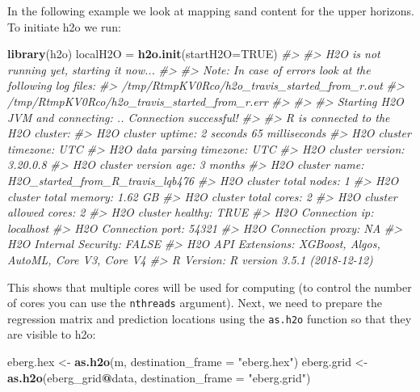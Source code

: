 \documentclass[graybox,natbib,nospthms,UStrade]{svmono}
\newenvironment{Shaded}{\begin{snugshade}}{\end{snugshade}}
\newcommand{\CommentTok}[1]{\textcolor[rgb]{0.37,0.37,0.37}{\textit{#1}}}
\newcommand{\DataTypeTok}[1]{\textcolor[rgb]{0.27,0.27,0.27}{#1}}
\newcommand{\KeywordTok}[1]{\textcolor[rgb]{0.27,0.27,0.27}{\textbf{#1}}}
\newcommand{\NormalTok}[1]{#1}
\newcommand{\OperatorTok}[1]{\textcolor[rgb]{0.43,0.43,0.43}{\textbf{#1}}}
\newcommand{\OtherTok}[1]{\textcolor[rgb]{0.37,0.37,0.37}{#1}}
\newcommand{\StringTok}[1]{\textcolor[rgb]{0.5,0.5,0.5}{#1}}
\begin{document}
In the following example we look at mapping sand content for the upper horizons. To initiate h2o we run:

\begin{Shaded}
\begin{Highlighting}[]
\KeywordTok{library}\NormalTok{(h2o)}
\NormalTok{localH2O =}\StringTok{ }\KeywordTok{h2o.init}\NormalTok{(}\DataTypeTok{startH2O=}\OtherTok{TRUE}\NormalTok{)}
\CommentTok{#> }
\CommentTok{#> H2O is not running yet, starting it now...}
\CommentTok{#> }
\CommentTok{#> Note:  In case of errors look at the following log files:}
\CommentTok{#>     /tmp/RtmpKV0Rco/h2o_travis_started_from_r.out}
\CommentTok{#>     /tmp/RtmpKV0Rco/h2o_travis_started_from_r.err}
\CommentTok{#> }
\CommentTok{#> }
\CommentTok{#> Starting H2O JVM and connecting: .. Connection successful!}
\CommentTok{#> }
\CommentTok{#> R is connected to the H2O cluster: }
\CommentTok{#>     H2O cluster uptime:         2 seconds 65 milliseconds }
\CommentTok{#>     H2O cluster timezone:       UTC }
\CommentTok{#>     H2O data parsing timezone:  UTC }
\CommentTok{#>     H2O cluster version:        3.20.0.8 }
\CommentTok{#>     H2O cluster version age:    3 months  }
\CommentTok{#>     H2O cluster name:           H2O_started_from_R_travis_lqb476 }
\CommentTok{#>     H2O cluster total nodes:    1 }
\CommentTok{#>     H2O cluster total memory:   1.62 GB }
\CommentTok{#>     H2O cluster total cores:    2 }
\CommentTok{#>     H2O cluster allowed cores:  2 }
\CommentTok{#>     H2O cluster healthy:        TRUE }
\CommentTok{#>     H2O Connection ip:          localhost }
\CommentTok{#>     H2O Connection port:        54321 }
\CommentTok{#>     H2O Connection proxy:       NA }
\CommentTok{#>     H2O Internal Security:      FALSE }
\CommentTok{#>     H2O API Extensions:         XGBoost, Algos, AutoML, Core V3, Core V4 }
\CommentTok{#>     R Version:                  R version 3.5.1 (2018-12-12)}
\end{Highlighting}
\end{Shaded}

This shows that multiple cores will be used for computing (to control the number of cores you can use the \texttt{nthreads} argument). Next, we need to prepare the regression matrix and prediction locations using the \texttt{as.h2o} function so that they are visible to h2o:

\begin{Shaded}
\begin{Highlighting}[]
\NormalTok{eberg.hex <-}\StringTok{ }\KeywordTok{as.h2o}\NormalTok{(m, }\DataTypeTok{destination_frame =} \StringTok{"eberg.hex"}\NormalTok{)}
\NormalTok{eberg.grid <-}\StringTok{ }\KeywordTok{as.h2o}\NormalTok{(eberg_grid}\OperatorTok{@}\NormalTok{data, }\DataTypeTok{destination_frame =} \StringTok{"eberg.grid"}\NormalTok{)}
\end{Highlighting}
\end{Shaded}
\end{document}
